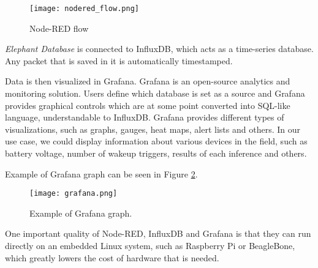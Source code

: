 \begin{figure}[ht]
    \centering
    \texttt{[image: nodered\_flow.png]} 
    \caption{ Node-RED flow}
    \label{nodered_flow}
\end{figure}

\textit{Elephant Database} is connected to InfluxDB, which acts as a time-series database.
Any packet that is saved in it is automatically timestamped.

Data is then visualized in Grafana. 
Grafana is an open-source analytics and monitoring solution.
Users define which database is set as a source and Grafana provides graphical controls which are at some point converted into SQL-like language, understandable to InfluxDB.
Grafana provides different types of visualizations, such as graphs, gauges, heat maps, alert lists and others.
In our use case, we could display information about various devices in the field, such as battery voltage, number of wakeup triggers, results of each inference and others.

Example of Grafana graph can be seen in Figure \ref{grafana}.
\clearpage
\begin{figure}[ht]
    \centering
    \texttt{[image: grafana.png]} 
    \caption{ Example of Grafana graph.}
    \label{grafana}
\end{figure}

One important quality of Node-RED, InfluxDB and Grafana is that they can run directly on an embedded Linux system, such as Raspberry Pi or BeagleBone, which greatly lowers the cost of hardware that is needed.
